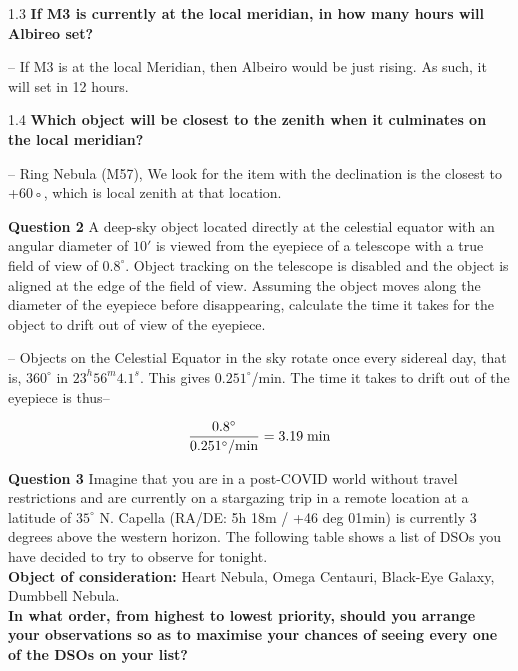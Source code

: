 \documentclass[a4paper,12pt]{extarticle}
\begin{document}
    
1.3 \textbf{If M3 is currently at the local meridian, in how many hours will Albireo set?}

\begin{sol}
    -- If M3 is at the local Meridian, then Albeiro would be just rising. As such, it will set in 12 hours.
\end{sol}

    
1.4 \textbf{Which object will be closest to the zenith when it culminates on the local meridian?}

\begin{sol}
	  -- Ring Nebula (M57), We look for the item with the declination is the closest to +60◦, which is local zenith at that location.
\end{sol}
  
    
\textsf{\textbf{Question 2}}  A deep-sky object located directly at the celestial equator with an angular diameter of $10'$ is viewed from the eyepiece of a telescope with a true field of view of $0.8^\circ$. Object tracking on the telescope is disabled and the object is aligned at the edge of the field of view. Assuming the object moves along the diameter of the eyepiece before disappearing, calculate the time it takes for the object to drift out of view of the eyepiece.

\begin{sol}
-- Objects on the Celestial Equator in the sky rotate once every sidereal day, that is, $360^\circ$ in $23^h56^m4.1^s$. This gives $0.251^\circ$/min. The time it takes to drift out of the eyepiece is thus--

\[\frac{0.8^\circ}{0.251^\circ/\rm min}=3.19\; \rm min\]	
\end{sol}

\textsf{\textbf{Question 3}} Imagine that you are in a post-COVID world without travel restrictions and are currently on a stargazing trip in a remote location at a latitude of $35^\circ$ N. Capella (RA/DE: 5h 18m / +46 deg 01min) is currently 3 degrees above the western horizon. The following table shows a list of DSOs you have decided to try to observe for tonight. \\

\textbf{Object of consideration:} Heart Nebula, Omega Centauri, Black-Eye Galaxy, Dumbbell Nebula. \\

\textbf{In what order, from highest to lowest priority, should you arrange your observations so as to maximise your chances of seeing every one of the DSOs on your list?}
\end{document}
